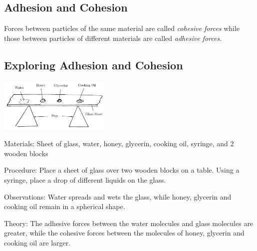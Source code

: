 \begin{multicols}{2}

\section*{Adhesion and Cohesion}
Forces between particles of the same material are called \emph{cohesive forces} while those between particles of different materials are called \emph{adhesive forces}.


\subsection{Exploring Adhesion and Cohesion}

\begin{center}
\includegraphics[width=0.4\textwidth]{./img/adhesion-cohesion.png}
\end{center}

\begin{description*}
\item[Materials:]{Sheet of glass, water, honey, glycerin, cooking oil, syringe, and 2 wooden blocks}
\item[Procedure:]{Place a sheet of glass over two wooden blocks on a table. Using a syringe, place a drop of different liquids on the glass.}
\item[Observations:]{Water spreads and wets the glass, while honey, glycerin and cooking oil remain in a spherical shape.}
\item[Theory:]{The adhesive forces between the water molecules and glass molecules are greater, while the cohesive forces between the molecules of honey, glycerin and cooking oil are larger.}
\end{description*}


\end{multicols}
